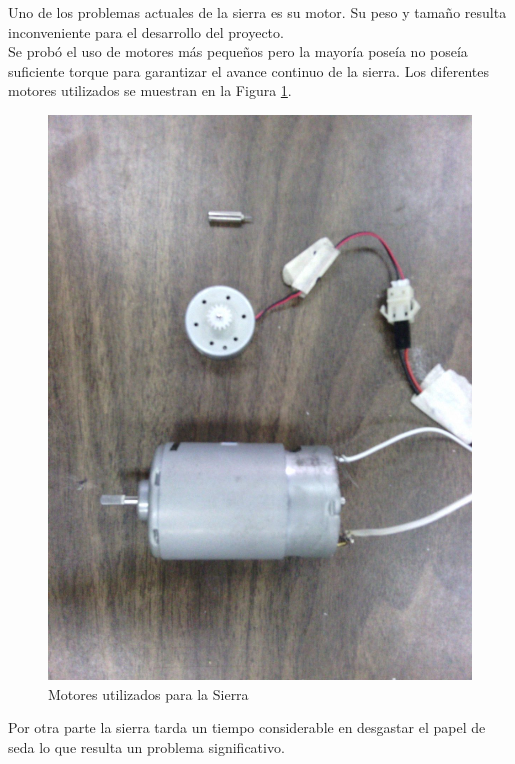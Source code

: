 \documentclass[conference]{IEEEtran}
\begin{document}
Uno de los problemas actuales de la sierra es su motor. Su peso y tamaño resulta inconveniente para el desarrollo del proyecto.\\

Se probó el uso de motores más pequeños pero la mayoría poseía no poseía suficiente torque para garantizar el avance continuo de la sierra. Los diferentes motores utilizados se muestran en la Figura \ref{fig:motor}.\\



\begin{figure}[htp]
	\centering
	\includegraphics[scale=0.15,type=jpg,ext=.jpg,read=.jpg]{motor}
	\caption{Motores utilizados para la Sierra}
	\label{fig:motor}
\end{figure}

Por otra parte la sierra tarda un tiempo considerable en desgastar el papel de seda lo que resulta un problema significativo.\\ 
\end{document}
